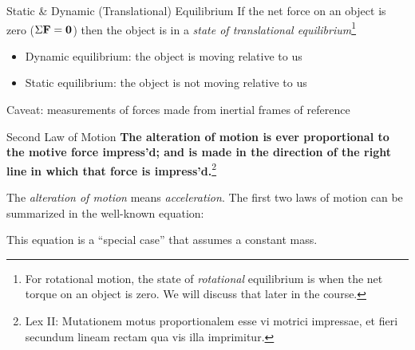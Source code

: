 \documentclass[12pt,compress,aspectratio=169]{beamer}
\newcommand{\mb}[1]{\ensuremath\mathbf{#1}}
\newcommand{\eq}[2]{\vspace{#1}{\Large\begin{displaymath}#2\end{displaymath}}}
\begin{document}
\begin{frame}{Static \& Dynamic (Translational) Equilibrium}
  If the net force on an object is zero ($\Sigma\mb{F}=\mb{0}$) then the
  object is in a \emph{state of translational equilibrium}\footnote{For
    rotational motion, the state of \emph{rotational} equilibrium is when the
    net torque on an object is zero. We will discuss that later in the course.}
  \begin{itemize}
  \item Dynamic equilibrium: the object is moving relative to us
  \item Static equilibrium: the object is not moving relative to us
  \end{itemize}
  Caveat: measurements of forces made from inertial frames of reference
\end{frame}



\begin{frame}{Second Law of Motion}
  \textbf{The alteration of motion is ever proportional to the motive force
    impress'd; and is made in the direction of the right line in which that
    force is impress'd.}\footnote{Lex II: Mutationem motus proportionalem esse
    vi motrici impressae, et fieri secundum lineam rectam qua vis illa
    imprimitur.}

  \vspace{.2in}The \emph{alteration of motion} means \emph{acceleration}. The
  first two laws of motion can be summarized in the well-known equation:

  \eq{-.2in}{
    \boxed{\mb{F}_{\textrm{net}}=\Sigma\mb{F}=m\mb{a}}
  }

  \textcolor{red!80!black}{This equation is a ``special case'' that assumes a
    constant mass.}
\end{frame}
\end{document}
